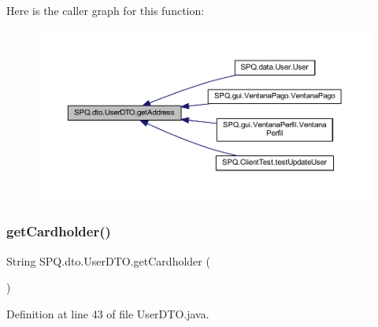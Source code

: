 Here is the caller graph for this function\+:
\nopagebreak
\begin{figure}[H]
\begin{center}
\leavevmode
\includegraphics[width=350pt]{class_s_p_q_1_1dto_1_1_user_d_t_o_a5234f9e12bcda79c32c4aec80de40ad2_icgraph}
\end{center}
\end{figure}
\mbox{\label{class_s_p_q_1_1dto_1_1_user_d_t_o_a82fe9a242f18d3cb62735cee648e71d9}} 
\subsubsection{\texorpdfstring{get\+Cardholder()}{getCardholder()}}
{\footnotesize\ttfamily String S\+P\+Q.\+dto.\+User\+D\+T\+O.\+get\+Cardholder (\begin{DoxyParamCaption}{ }\end{DoxyParamCaption})}



Definition at line 43 of file User\+D\+T\+O.\+java.

